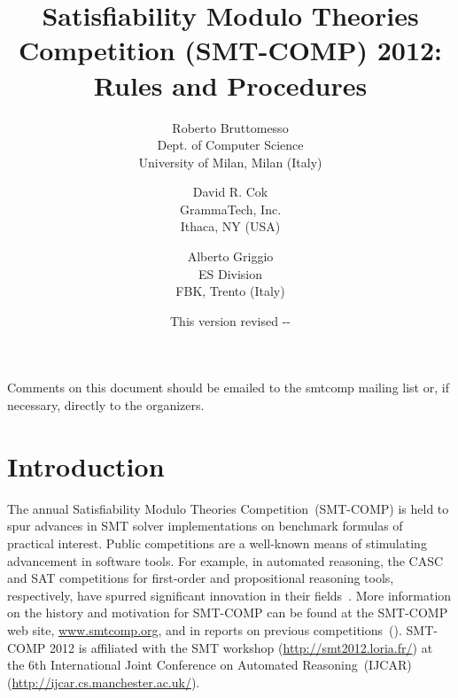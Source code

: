 \documentclass[12pt]{article}
\begin{document}
\date{\small This version revised \the\year-\the\month-\the\day}

\title{Satisfiability Modulo Theories Competition (SMT-COMP) 2012: Rules and 
Procedures}


\def\doauthor#1{{%
  \hsize.5\hsize \advance\hsize by-1cm %
  \def\\{\hss\egroup\hbox to\hsize\bgroup\strut\hss}%
  \vbox{\hbox to\hsize\bgroup\strut\hss#1\hss\egroup}}}%

\def\header#1{\medskip\noindent\textbf{#1}}

\author{
Roberto Bruttomesso\\
Dept. of Computer Science\\
University of Milan, Milan (Italy)
\and
David R. Cok \\
GrammaTech, Inc. \\
Ithaca, NY (USA) \\
\and
Alberto Griggio\\
ES Division\\
FBK, Trento (Italy)
}

\maketitle

\def\eg{\textit{e.g.}}
\def\ie{\textit{i.e.}}

\noindent Comments on this document should be emailed to the smtcomp mailing
list or, if necessary, directly to the organizers.

\section{Introduction}
\label{sec:intro}

The annual Satisfiability Modulo Theories Competition~(SMT-COMP) is
held to spur advances in SMT solver implementations on benchmark
formulas of practical interest.  Public competitions are a well-known
means of stimulating advancement in software tools.  For example, in
automated reasoning, the CASC and SAT competitions for first-order and
propositional reasoning tools, respectively, have spurred significant
innovation in their fields~\cite{PSS02,leberre+03}.  More information
on the history and motivation for SMT-COMP can be found at the
SMT-COMP web site, \url{www.smtcomp.org}, and in reports on previous
competitions~(\cite{SMTCOMP-2008,BDOS08,SMTCOMP-FMSD,SMTCOMP-JAR}).
SMT-COMP 2012 is affiliated with the SMT workshop (\url {http://smt2012.loria.fr/}) at the 6th International
Joint Conference on Automated Reasoning~(IJCAR) (\url{http://ijcar.cs.manchester.ac.uk/}).
\end{document}
